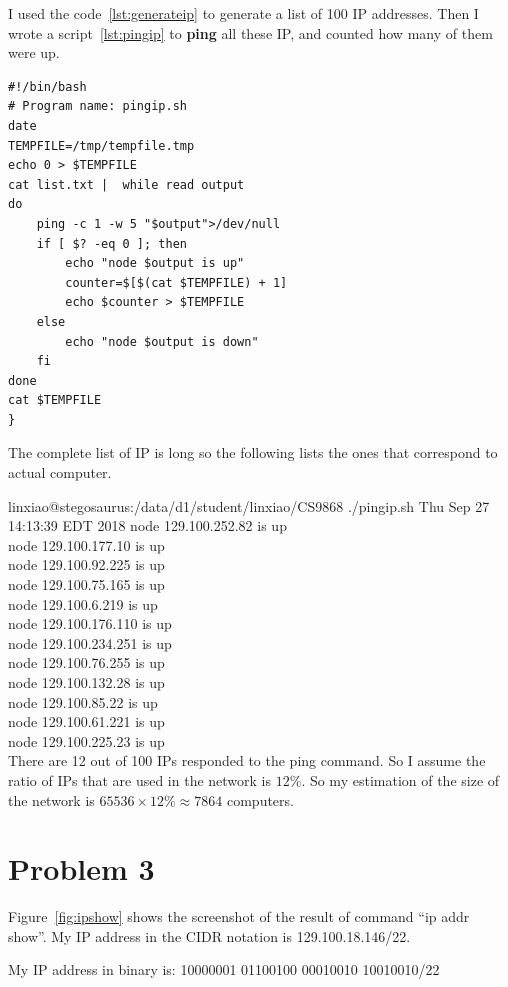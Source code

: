 \documentclass[paper=a4, fontsize=11pt]{scrartcl} %
\numberwithin{equation}{section} %
\numberwithin{figure}{section} %
\numberwithin{table}{section} %
\begin{document}
I used the code~\ref{lst:generateip} to generate a list of 100 IP addresses. Then I wrote a script~\ref{lst:pingip} to \textbf{ping} all these IP, and counted how many of them were up.
\begin{lstlisting}[caption={Script for ping all the IP},captionpos=b,label = {lst:pingip}]
#!/bin/bash
# Program name: pingip.sh
date
TEMPFILE=/tmp/tempfile.tmp
echo 0 > $TEMPFILE
cat list.txt |  while read output
do
	ping -c 1 -w 5 "$output">/dev/null
	if [ $? -eq 0 ]; then
		echo "node $output is up"
		counter=$[$(cat $TEMPFILE) + 1]
		echo $counter > $TEMPFILE
	else
		echo "node $output is down"
	fi
done
cat $TEMPFILE
}
\end{lstlisting}

The complete list of IP is long so the following lists the ones that correspond to actual computer.

linxiao@stegosaurus:/data/d1/student/linxiao/CS9868 ./pingip.sh 
Thu Sep 27 14:13:39 EDT 2018
node 129.100.252.82 is up\\
node 129.100.177.10 is up\\
node 129.100.92.225 is up\\
node 129.100.75.165 is up\\
node 129.100.6.219 is up\\
node 129.100.176.110 is up\\
node 129.100.234.251 is up\\
node 129.100.76.255 is up\\
node 129.100.132.28 is up\\
node 129.100.85.22 is up\\
node 129.100.61.221 is up\\
node 129.100.225.23 is up\\

There are 12 out of 100 IPs responded to the ping command. So I assume the ratio of IPs that are used in the network is $12\%$. So my estimation of the size of the network is $65536 \times 12\% \approx 7864$ computers.

\section*{Problem 3}
Figure~\ref{fig:ipshow} shows the screenshot of the result of command ``ip addr show''. My IP address in the CIDR notation is 129.100.18.146/22.

My IP address in binary is: 10000001 01100100 00010010 10010010/22
\end{document}
